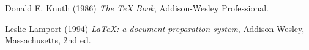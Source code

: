 \documentclass[ngerman]{scrreprt}
\begin{document}
\begin{thebibliography}{9}
	Donald E. Knuth (1986) \emph{The \TeX{} Book}, Addison-Wesley Professional.
	
	Leslie Lamport (1994) \emph{\LaTeX: a document preparation system}, Addison
	Wesley, Massachusetts, 2nd ed.
\end{thebibliography}
\end{document}
